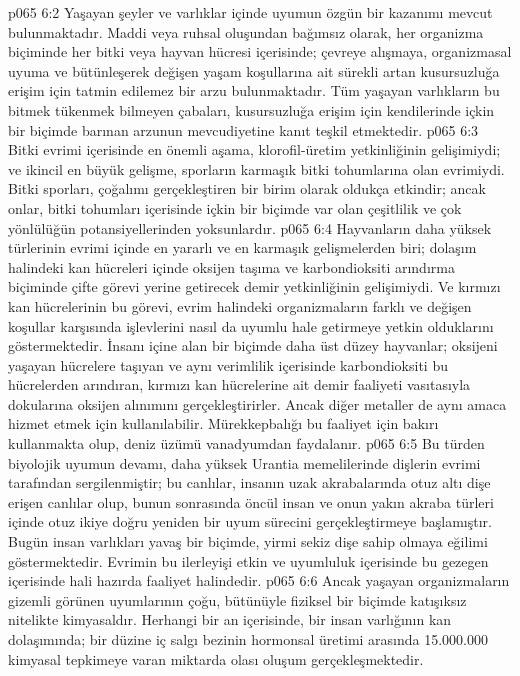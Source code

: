 \vs p065 6:2 Yaşayan şeyler ve varlıklar içinde uyumun özgün bir kazanımı mevcut bulunmaktadır. Maddi veya ruhsal oluşundan bağımsız olarak, her  organizma biçiminde her  bitki veya hayvan hücresi içerisinde; çevreye alışmaya, organizmasal uyuma ve bütünleşerek değişen yaşam koşullarına ait sürekli artan kusursuzluğa erişim için tatmin edilemez bir arzu bulunmaktadır. Tüm yaşayan varlıkların bu bitmek tükenmek bilmeyen çabaları, kusursuzluğa erişim için kendilerinde içkin bir biçimde barınan arzunun mevcudiyetine kanıt teşkil etmektedir.
\vs p065 6:3 Bitki evrimi içerisinde en önemli aşama, klorofil\hyp{}üretim yetkinliğinin gelişimiydi; ve ikincil en büyük gelişme, sporların karmaşık bitki tohumlarına olan evrimiydi. Bitki sporları, çoğalımı gerçekleştiren bir birim olarak oldukça etkindir; ancak onlar, bitki tohumları içerisinde içkin bir biçimde var olan çeşitlilik ve çok yönlülüğün potansiyellerinden yoksunlardır.
\vs p065 6:4 Hayvanların daha yüksek türlerinin evrimi içinde en yararlı ve en karmaşık gelişmelerden biri; dolaşım halindeki kan hücreleri içinde oksijen taşıma ve karbondioksiti arındırma biçiminde çifte görevi yerine getirecek demir yetkinliğinin gelişimiydi. Ve kırmızı kan hücrelerinin bu görevi, evrim halindeki organizmaların farklı ve değişen koşullar karşısında işlevlerini nasıl da uyumlu hale getirmeye yetkin olduklarını göstermektedir. İnsanı içine alan bir biçimde daha üst düzey hayvanlar; oksijeni yaşayan hücrelere taşıyan ve aynı verimlilik içerisinde karbondioksiti bu hücrelerden arındıran, kırmızı kan hücrelerine ait demir faaliyeti vasıtasıyla dokularına oksijen alınımını gerçekleştirirler. Ancak diğer metaller de aynı amaca hizmet etmek için kullanılabilir. Mürekkepbalığı bu faaliyet için bakırı kullanmakta olup, deniz üzümü vanadyumdan faydalanır.
\vs p065 6:5 Bu türden biyolojik uyumun devamı, daha yüksek Urantia memelilerinde dişlerin evrimi tarafından sergilenmiştir; bu canlılar, insanın uzak akrabalarında otuz altı dişe erişen canlılar olup, bunun sonrasında öncül insan ve onun yakın akraba türleri içinde otuz ikiye doğru yeniden bir uyum sürecini gerçekleştirmeye başlamıştır. Bugün insan varlıkları yavaş bir biçimde, yirmi sekiz dişe sahip olmaya eğilimi göstermektedir. Evrimin bu ilerleyişi etkin ve uyumluluk içerisinde bu gezegen içerisinde hali hazırda faaliyet halindedir.
\vs p065 6:6 Ancak yaşayan organizmaların gizemli görünen uyumlarının çoğu, bütünüyle fiziksel bir biçimde katışıksız nitelikte kimyasaldır. Herhangi bir an içerisinde, bir insan varlığının kan dolaşımında; bir düzine iç salgı bezinin hormonsal üretimi arasında 15.000.000 kimyasal tepkimeye varan miktarda olası oluşum gerçekleşmektedir.
